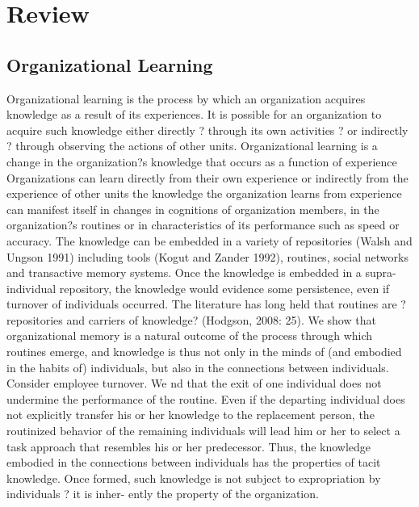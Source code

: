 \documentclass[12pt,letterpaper]{article}
\begin{document}
\section{Review}
\subsection{Organizational Learning}
Organizational learning is the process by which an organization acquires knowledge as a result of its experiences. It is possible for an organization to acquire such knowledge either directly ? through its own activities ? or indirectly ? through observing the actions of
other units. Organizational learning is a change in the organization?s knowledge that occurs as a function of experience  Organizations can learn directly from their own experience or indirectly from the experience of other units \citep{Levitt1988} the knowledge the organization learns from experience can manifest itself in changes in cognitions of organization members, in the organization?s routines or in characteristics of its performance such as speed or accuracy. The knowledge can be embedded in a variety of repositories (Walsh and Ungson 1991) including tools (Kogut and Zander 1992), routines, social networks and transactive memory systems. Once
the knowledge is embedded in a supra-individual repository, the knowledge would evidence some persistence, even if turnover of individuals occurred.
The literature has long held that routines are ?repositories and carriers of knowledge? (Hodgson, 2008: 25). We show that organizational memory is a natural outcome of the process through which routines emerge, and knowledge is thus not only in the minds of (and embodied in the habits of) individuals, but also in the connections between individuals. Consider employee turnover. We  nd that the exit of one individual does not undermine the performance of the routine. Even if the departing individual does not explicitly transfer his or her knowledge to the replacement person, the routinized behavior of the remaining individuals will lead him or her to select a task approach that resembles his or her predecessor. Thus, the knowledge embodied in the connections between individuals has the properties of tacit knowledge. Once formed, such knowledge is not subject to expropriation by individuals ? it is inher- ently the property of the organization.
\end{document}
